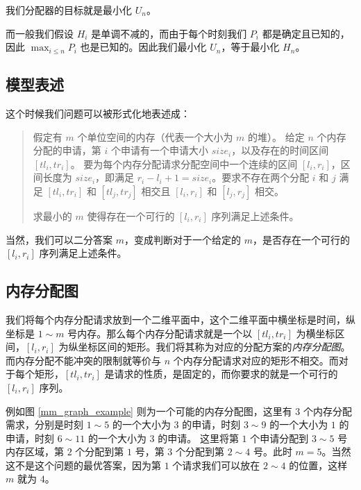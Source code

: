 \documentclass{noiassignment}
\begin{document}
	我们分配器的目标就是最小化 $U_n$。
	
	而一般我们假设 $H_i$ 是单调不减的，而由于每个时刻我们 $P_i$ 都是确定且已知的，因此 $\displaystyle \max_{i \le n} P_i$ 也是已知的。因此我们最小化 $U_n$，等于最小化 $H_n$。

	\subsection{模型表述}
	
	这个时候我们问题可以被形式化地表述成：
	
	\begin{quotation}
		假定有 $m$ 个单位空间的内存（代表一个大小为 $m$ 的堆）。
		给定 $n$ 个内存分配的申请，第 $i$ 个申请有一个申请大小 $size_i$，以及存在的时间区间 $[tl_i, tr_i]$。
		要为每个内存分配请求分配空间中一个连续的区间 $[l_i, r_i]$，区间长度为 $size_i$，即满足 $r_i - l_i + 1 = size_i$。要求不存在两个分配 $i$ 和 $j$ 满足 $[tl_i, tr_i]$ 和 $[tl_j, tr_j]$ 相交且 $[l_i, r_i]$ 和 $[l_j, r_j]$ 相交。

		求最小的 $m$ 使得存在一个可行的 $[l_i, r_i]$ 序列满足上述条件。
	\end{quotation}

	当然，我们可以二分答案 $m$，变成判断对于一个给定的 $m$，是否存在一个可行的 $[l_i, r_i]$ 序列满足上述条件。

	\subsection{内存分配图}

	我们将每个内存分配请求放到一个二维平面中，这个二维平面中横坐标是时间，纵坐标是 $1 \sim m$ 号内存。那么每个内存分配请求就是一个以 $[tl_i, tr_i]$ 为横坐标区间，$[l_i, r_i]$ 为纵坐标区间的矩形。我们将其称为对应的分配方案的\emph{内存分配图}。
	而内存分配不能冲突的限制就等价与 $n$ 个内存分配请求对应的矩形不相交。而对于每个矩形，$[tl_i, tr_i]$ 是请求的性质，是固定的，而你要求的就是一个可行的 $[l_i, r_i]$ 序列。
	
	例如图 \ref{mm_graph_example} 则为一个可能的内存分配图，这里有 $3$ 个内存分配需求，分别是时刻 $1 \sim 5$ 的一个大小为 $3$ 的申请，时刻 $3 \sim 9$ 的一个大小为 $1$ 的申请，时刻 $6 \sim 11$ 的一个大小为 $3$ 的申请。
	这里将第 $1$ 个申请分配到 $3 \sim 5$ 号内存区域，第 $2$ 个分配到第 $1$ 号，第 $3$ 个分配到第 $2 \sim 4$ 号。此时 $m=5$。当然这不是这个问题的最优答案，因为第 $1$ 个请求我们可以放在 $2 \sim 4$ 的位置，这样 $m$ 就为 $4$。
\end{document}
